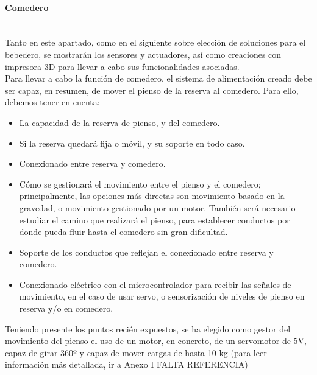 \documentclass[12pt]{article}
\newcommand{\subsubsubsection}[1]{\paragraph{#1}\mbox{}\\}
\begin{document}
	\pagebreak
	
	
	
	\subsubsubsection{Comedero}
	
	\noindent Tanto en este apartado, como en el siguiente sobre elección de soluciones para el bebedero, se mostrarán los sensores y actuadores, así como creaciones con impresora 3D para llevar a cabo sus funcionalidades asociadas.\\
	
	\noindent Para llevar a cabo la función de comedero, el sistema de alimentación creado debe ser capaz, en resumen, de mover el pienso de la reserva al comedero. Para ello, debemos tener en cuenta: 
	
	\begin{itemize}
		\item La capacidad de la reserva de pienso, y del comedero.
		\item Si la reserva quedará fija o móvil, y su soporte en todo caso.
		\item Conexionado entre reserva y comedero.
		\item Cómo se gestionará el movimiento entre el pienso y el comedero; principalmente, las opciones más directas son movimiento basado en la gravedad, o movimiento gestionado por un motor. También será necesario estudiar el camino que realizará el pienso, para establecer conductos por donde pueda fluir hasta el comedero sin gran dificultad.
		\item Soporte de los conductos que reflejan el conexionado entre reserva y comedero.
		\item Conexionado eléctrico con el microcontrolador para recibir las señales de movimiento, en el caso de usar servo, o sensorización de niveles de pienso en reserva y/o en comedero.
	\end{itemize}
	
	\noindent Teniendo presente los puntos recién expuestos, se ha elegido como gestor del movimiento del pienso el uso de un motor, en concreto, de un servomotor de 5V, capaz de girar 360º y capaz de mover cargas de hasta 10 kg (para leer información más detallada, ir a Anexo I FALTA REFERENCIA) \\
	
\end{document}
